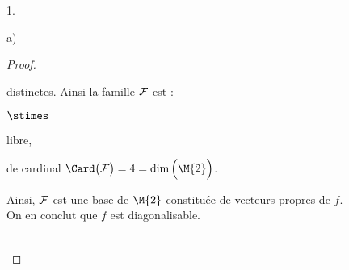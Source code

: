 \begin{noliste}{1.}
\begin{noliste}{a)}
\begin{proof}
\begin{remark}
        distinctes. Ainsi la famille ${\cal F}$ est :
        \begin{noliste}{$\stimes$}
        \item libre,
        \item de cardinal $\Card\big( {\cal F} \big) = 4 = \dim\Big(
          \M{2} \Big)$.         
        \end{noliste}
        Ainsi, ${\cal F}$ est une base de $\M{2}$ constituée de
        vecteurs propres de $f$.\\
        On en conclut que $f$ est diagonalisable.
      \end{remark}~\\[-1.8cm]
    \end{proof}
  \end{noliste}



\end{noliste}

